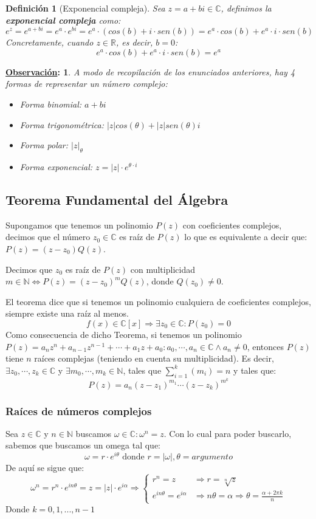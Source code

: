 \documentclass[10pt,a4paper,openright]{book}
\theoremstyle{break}
\newtheorem*{defi}{Definición}
\newtheorem*{obs}{\underline{Observación}:}
\begin{document}
\begin{defi}[Exponencial compleja]
Sea $z=a+bi\in \mathbb C$, definimos la \textbf{exponencial compleja} como:
$$e^z = e^{a+bi}=e^a\cdot e^{bi}=e^a\cdot (cos(b)+i\cdot sen(b))=e^a\cdot cos(b)+e^a\cdot i\cdot sen(b)$$
Concretamente, cuando $z\in \mathbb{R}$, es decir, $b=0$:
$$e^a\cdot cos(b)+e^a\cdot i\cdot sen(b)=e^a$$
\end{defi}

\begin{obs}
A modo de recopilación de los enunciados anteriores, hay 4 formas de representar un número complejo:
\begin{itemize}
\item Forma binomial: $a+bi$
\item Forma trigonométrica: $|z|cos(\theta)+ |z|sen(\theta)i$
\item Forma polar: $|z|_\theta$
\item Forma exponencial: $z=|z|\cdot e^{\theta\cdot i}$
\end{itemize}
\end{obs}

\subsection{Teorema Fundamental del Álgebra}
Supongamos que tenemos un polinomio $P(z)$ con coeficientes complejos, decimos que el número $z_0\in \mathbb C$ es raíz de $P(z)$ lo que es equivalente a decir que: $P(z)=(z-z_0)Q(z)$.\par
Decimos que $z_0$ es raíz de $P(z)$ con multiplicidad $m\in \mathbb N\Leftrightarrow P(z)=(z-z_0)^mQ(z)$, donde $Q(z_0)\neq 0$.\par
El teorema dice que si tenemos un polinomio cualquiera de coeficientes complejos, siempre existe una raíz al menos.
$$f(x)\in \mathbb C[x]\Rightarrow \exists z_0\in \mathbb C: P(z_0)=0$$
Como consecuencia de dicho Teorema, si tenemos un polinomio $P(z)=a_nz^n+a_{n-1}z^{n-1}+\cdots + a_1z+a_0: a_0,\cdots, a_n\in \mathbb C \wedge a_n\neq 0$, entonces $P(z)$ tiene $n$ raíces complejas (teniendo en cuenta su multiplicidad). Es decir, $\exists z_0,\cdots, z_k\in \mathbb C$ y $\exists m_0,\cdots, m_k\in \mathbb N$, tales que $\sum_{i=1}^k(m_i)=n$ y tales que:
$$P(z)=a_n(z-z_1)^{m_1}\cdots (z-z_k)^{m^k}$$

\subsubsection{Raíces de números complejos}
Sea $z\in \mathbb C$ y $n\in \mathbb N$ buscamos $\omega \in \mathbb C: \omega^n=z$. Con lo cual para poder buscarlo, sabemos que buscamos un omega tal que:
$$\omega=r\cdot e^{i\theta}\mbox{ donde }r=|\omega|, \theta=argumento$$
De aquí se sigue que:
$$\omega^n=r^n\cdot e^{in\theta}=z=|z|\cdot e^{i\alpha}\Rightarrow
\begin{cases}
r^n=z & \Rightarrow r=\sqrt[n]{z} \\
e^{in\theta}=e^{i\alpha} & \Rightarrow n\theta=\alpha\Rightarrow \theta=\frac{\alpha+2\pi k}{n}
\end{cases}
$$
Donde $k=0,1,..., n-1$
\end{document}
